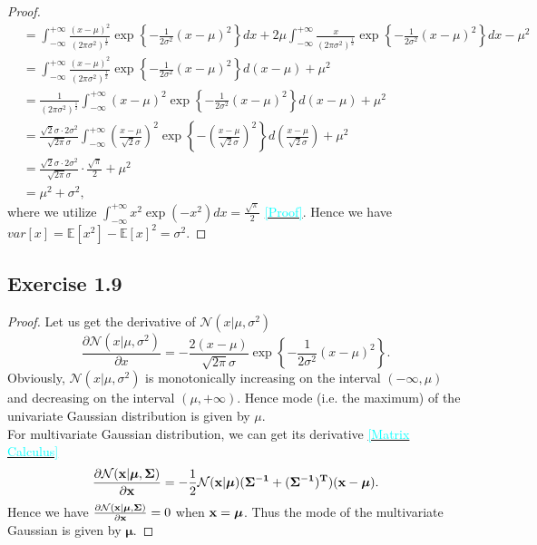 \documentclass[11pt]{article}
\theoremstyle{definition}
\newcommand{\E}{\mathbb{E}}
\newcommand{\cyan}[1]{\textcolor{cyan}{#1}}
\begin{document}
\begin{proof}
\begin{align*}
&= \int^{+\infty}_{-\infty}\frac{(x-\mu)^2}{(2\pi\sigma^2)^{\frac{1}{2}}}\exp\left\{-\frac{1}{2\sigma^2}\left(x-\mu\right)^2\right\}dx + 2\mu \int^{+\infty}_{-\infty}\frac{x}{(2\pi\sigma^2)^{\frac{1}{2}}}\exp\left\{-\frac{1}{2\sigma^2}\left(x-\mu\right)^2\right\}dx-\mu^2\\
&=\int^{+\infty}_{-\infty}\frac{(x-\mu)^2}{(2\pi\sigma^2)^{\frac{1}{2}}}\exp\left\{-\frac{1}{2\sigma^2}\left(x-\mu\right)^2\right\}d(x-\mu) + \mu^2\\
&= \frac{1}{(2\pi\sigma^2)^{\frac{1}{2}}}\int^{+\infty}_{-\infty}(x-\mu)^2\exp\left\{-\frac{1}{2\sigma^2}\left(x-\mu\right)^2\right\}d(x-\mu) + \mu^2\\
&= \frac{\sqrt{2}\sigma \cdot 2\sigma^2}{\sqrt{2\pi}\sigma}\int^{+\infty}_{-\infty}\left(\frac{x-\mu}{\sqrt{2}\sigma}\right)^2\exp\left\{-\left(\frac{x-\mu}{\sqrt{2}\sigma}\right)^2\right\}d\left(\frac{x-\mu}{\sqrt{2}\sigma}\right) + \mu^2\\
&= \frac{\sqrt{2}\sigma \cdot 2\sigma^2}{\sqrt{2\pi}\sigma} \cdot \frac{\sqrt{\pi}}{2} + \mu^2\\
&= \mu^2 + \sigma^2,
\end{align*}
where we utilize $\int^{+\infty}_{-\infty}x^2\exp(-x^2)dx = \frac{\sqrt{\pi}}{2}$ \href{https://math.stackexchange.com/questions/66084/integral-int-infty-infty-x2-e-x2-mathrm-dx}{\cyan{[Proof]}}. Hence we have $var[x] = \E[x^2] - \E[x]^2 = \sigma^2$.
\end{proof}

\subsection{Exercise 1.9}
\begin{proof}
Let us get the derivative of $\mathcal{N}(x|\mu, \sigma^2)$
\begin{equation*}
\frac{\partial\mathcal{N}(x|\mu, \sigma^2)}{\partial x} =  -\frac{2(x-\mu)}{\sqrt{2\pi}\sigma}\exp\left\{-\frac{1}{2\sigma^2}\left(x-\mu\right)^2\right\}.
\end{equation*}
Obviously, $\mathcal{N}(x|\mu, \sigma^2)$ is monotonically increasing on the interval $(-\infty, \mu)$ and decreasing on the interval $(\mu, +\infty)$. Hence mode (i.e. the maximum) of the univariate Gaussian distribution is given by $\mu$.\\
For multivariate Gaussian distribution, we can get its derivative \href{https://www.matrixcalculus.org/}{\cyan{[Matrix Calculus]}}
\begin{equation*}
\frac{\partial\mathcal{N}(\bf x|\boldsymbol{\mu}, \bf\Sigma)}{\partial \bf x} = -\frac{1}{2}\mathcal{N}(\bf x|\boldsymbol{\mu})(\bf \Sigma^{-1} + (\bf {\Sigma^{-1}})^{T})(\bf x - \boldsymbol{\mu}).
\end{equation*}
Hence we have $\frac{\partial\mathcal{N}(\bf x|\boldsymbol{\mu}, \bf\Sigma)}{\partial \bf x} = 0$ when $\bf x = \boldsymbol{\mu}$. Thus the mode of the multivariate Gaussian is given by $\boldsymbol{\mu}$.
\end{proof}
\end{document}

